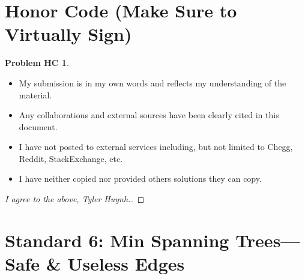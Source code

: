 \documentclass[11pt]{article}
\theoremstyle{definition}
\theoremstyle{definition}
\newtheorem*{requiredHC}{Problem HC}
\theoremstyle{definition}
\newcommand{\standard}{6}
\begin{document}
\newpage
\section*{Honor Code (Make Sure to Virtually Sign)} \label{HonorCode}
\hypertarget{HonorCode}{}

\begin{requiredHC}
\begin{itemize}
\item My submission is in my own words and reflects my understanding of the material.
\item Any collaborations and external sources have been clearly cited in this document.
\item I have not posted to external services including, but not limited to Chegg, Reddit, StackExchange, etc.
\item I have neither copied nor provided others solutions they can copy.
\end{itemize}

\end{requiredHC}

\begin{proof}[I agree to the above, Tyler Huynh.]
\end{proof}


\newpage
\setcounter{section}{\standard-1}
\section{Standard \standard: Min Spanning Trees---Safe \& Useless Edges}
\end{document}
